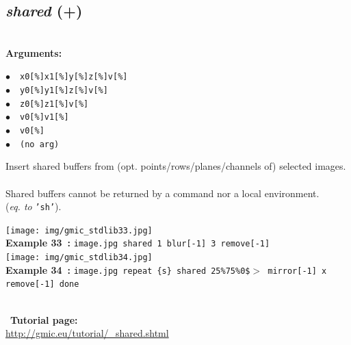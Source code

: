 \documentclass[a4paper,10.5pt,twoside]{book}
\def\comma{\discretionary{,}{}{,}}
\newcommand{\Cb}[1]{\textcolor{cb}{#1}}
\begin{document}
\subsection{\emph{shared} (+)}\vspace*{-0.7em}
~\\\textbf{\Cb{Arguments: }}\begin{flushleft}
{\small \Cb{\hspace*{0.5cm}$\bullet$~~\texttt{x0[\%]{\comma}x1[\%]{\comma}y[\%]{\comma}z[\%]{\comma}v[\%]}}}~~~\\
{\small \Cb{\hspace*{0.5cm}$\bullet$~~\texttt{y0[\%]{\comma}y1[\%]{\comma}z[\%]{\comma}v[\%]}}}~~~\\
{\small \Cb{\hspace*{0.5cm}$\bullet$~~\texttt{z0[\%]{\comma}z1[\%]{\comma}v[\%]}}}~~~\\
{\small \Cb{\hspace*{0.5cm}$\bullet$~~\texttt{v0[\%]{\comma}v1[\%]}}}~~~\\
{\small \Cb{\hspace*{0.5cm}$\bullet$~~\texttt{v0[\%]}}}~~~\\
{\small \Cb{\hspace*{0.5cm}$\bullet$~~\texttt{(no arg)}}}\end{flushleft}
Insert shared buffers from (opt. points/rows/planes/channels of) selected images.
~\\Shared buffers cannot be returned by a command{\comma} nor a local environment.
~\\(\emph{eq. to} {\small \texttt{'sh'}}).
\begin{center}\texttt{[image: img/gmic\_stdlib33.jpg]}\\
{\footnotesize \textbf{Example 33~:} \texttt{image.jpg shared 1 blur[-1] 3 remove[-1]}}
\\\texttt{[image: img/gmic\_stdlib34.jpg]}\\
{\footnotesize \textbf{Example 34~:} \texttt{image.jpg repeat \{s\} shared 25\%{\comma}75\%{\comma}0{\comma}\$$>$ mirror[-1] x remove[-1] done}}
\end{center}
~\\
~\textbf{Tutorial page: }\\\url{http://gmic.eu/tutorial/\_shared.shtml}
\end{document}
